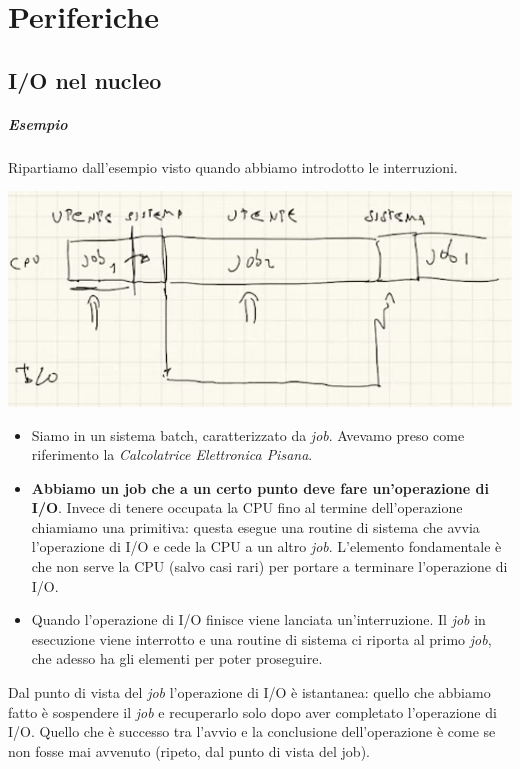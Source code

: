 \chapter{Periferiche}
\section{I/O nel nucleo}  
\paragraph{Esempio} Ripartiamo dall'esempio visto quando abbiamo introdotto le interruzioni.
\begin{center}
	\includegraphics[scale=.8]{img/277.PNG}
\end{center}
\begin{itemize}
	\item Siamo in un sistema  batch, caratterizzato da \emph{job}. Avevamo preso come riferimento la \emph{Calcolatrice Elettronica Pisana}.
	\item \textbf{Abbiamo un job che a un certo punto deve fare un'operazione di I/O}. Invece di tenere occupata la CPU fino al termine dell'operazione chiamiamo una primitiva: questa esegue una routine di sistema che avvia l'operazione di I/O e cede la CPU a un altro \emph{job}. L'elemento fondamentale è che non serve la CPU (salvo casi rari) per portare a terminare l'operazione di I/O.
	\item Quando l'operazione di I/O finisce viene lanciata un'interruzione. Il \emph{job} in esecuzione viene interrotto e una routine di sistema ci riporta al primo \emph{job}, che adesso ha gli elementi per poter proseguire.
\end{itemize}
Dal punto di vista del \emph{job} l'operazione di I/O è istantanea: quello che abbiamo fatto è sospendere il \emph{job} e recuperarlo solo dopo aver completato l'operazione di I/O. Quello che è successo tra l'avvio e la conclusione dell'operazione è come se non fosse mai avvenuto (ripeto, dal punto di vista del job). 
